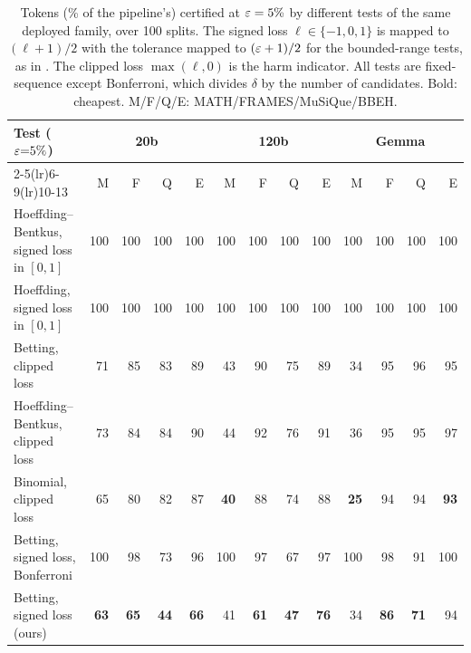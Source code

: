 \begin{table}[p]
\centering
\footnotesize
\setlength{\tabcolsep}{3pt}
\begin{tabular}{@{}lrrrrrrrrrrrr@{}}
\toprule
Test ($\varepsilon{=}5\%$) & \multicolumn{4}{c}{20b} & \multicolumn{4}{c}{120b} & \multicolumn{4}{c}{Gemma} \\
\cmidrule(lr){2-5}\cmidrule(lr){6-9}\cmidrule(lr){10-13}
 & M & F & Q & E & M & F & Q & E & M & F & Q & E \\
\midrule
Hoeffding--Bentkus, signed loss in $[0,1]$ & 100 & 100 & 100 & 100 & 100 & 100 & 100 & 100 & 100 & 100 & 100 & 100 \\
Hoeffding, signed loss in $[0,1]$ & 100 & 100 & 100 & 100 & 100 & 100 & 100 & 100 & 100 & 100 & 100 & 100 \\
Betting, clipped loss & 71 & 85 & 83 & 89 & 43 & 90 & 75 & 89 & 34 & 95 & 96 & 95 \\
Hoeffding--Bentkus, clipped loss & 73 & 84 & 84 & 90 & 44 & 92 & 76 & 91 & 36 & 95 & 95 & 97 \\
Binomial, clipped loss & 65 & 80 & 82 & 87 & \textbf{40} & 88 & 74 & 88 & \textbf{25} & 94 & 94 & \textbf{93} \\
Betting, signed loss, Bonferroni & 100 & 98 & 73 & 96 & 100 & 97 & 67 & 97 & 100 & 98 & 91 & 100 \\
\midrule
Betting, signed loss (ours) & \textbf{63} & \textbf{65} & \textbf{44} & \textbf{66} & 41 & \textbf{61} & \textbf{47} & \textbf{76} & 34 & \textbf{86} & \textbf{71} & 94 \\
\bottomrule
\end{tabular}
\caption{Tokens (\% of the pipeline's) certified at $\varepsilon = 5\%$ by different tests of the same deployed family, over
100 splits. The signed loss $\ell \in \{-1,0,1\}$ is mapped to $(\ell+1)/2$ with the tolerance mapped to $(\varepsilon+1)/2$ for the
bounded-range tests, as in \citet{wynn2026corrupted}. The clipped loss $\max(\ell, 0)$ is the harm indicator. All tests
are fixed-sequence except Bonferroni, which divides $\delta$ by the number of candidates. Bold: cheapest. M/F/Q/E:
MATH/FRAMES/MuSiQue/BBEH.}
\label{tab:calibfull}
\end{table}
